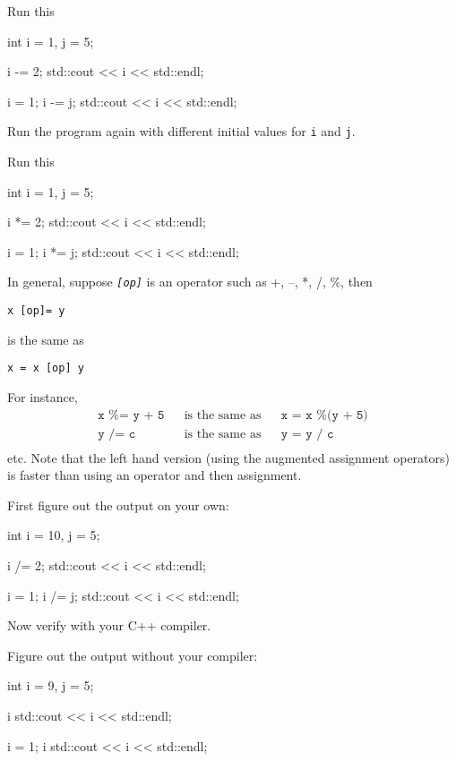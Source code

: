 \begin{ex}
Run this
\begin{console}
int i = 1, j = 5;

i -= 2;
std::cout << i << std::endl;

i = 1;
i -= j;
std::cout << i << std::endl;
\end{console}
Run the program again with different initial values for \texttt{i} and
\texttt{j}.
\end{ex}

\begin{ex}
Run this
\begin{console}
int i = 1, j = 5;

i *= 2;
std::cout << i << std::endl;

i = 1;
i *= j;
std::cout << i << std::endl;
\end{console}
\end{ex}

In general, suppose \emph{\texttt{[op]}} is an operator such as +, --, *, /,
\%, then
\begin{center}
\texttt{x [op]= y}
\end{center}
is the same as
\begin{center}
\texttt{x = x [op] y}
\end{center}
For instance,
\begin{align*}
\texttt{x \%= y + 5} && \text{is the same as} && \texttt{x = x \% (y + 5)}\\
\texttt{y /= c} && \text{is the same as} && \texttt{y = y / c}\\
\end{align*}
etc. Note that the left hand version (using the augmented assignment
operators) is faster than using an operator and then assignment.

\begin{ex}
First figure out the output on your own:
\begin{console}
int i = 10, j = 5;

i /= 2;
std::cout << i << std::endl;

i = 1;
i /= j;
std::cout << i << std::endl;
\end{console}
\end{ex}

Now verify with your C++ compiler.

\begin{ex}
Figure out the output without your compiler:
\begin{console}
int i = 9, j = 5;

i %
std::cout << i << std::endl;

i = 1;
i %
std::cout << i << std::endl;
\end{console}
\end{ex}

